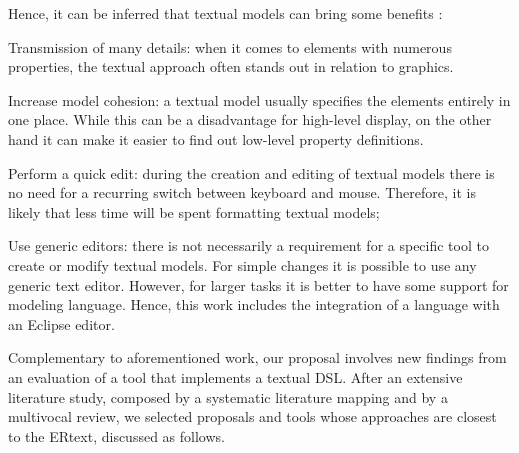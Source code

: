 \documentclass[a4paper,twoside,anonymous]{article}
\begin{document}
Hence, it can be inferred that textual models can bring some benefits \cite{XtextSirius:2020}:
\begin{inparaenum}[(i)]
    \item Transmission of many details: when it comes to elements with numerous properties, the textual approach often stands out in relation to graphics.
    \item Increase model cohesion: a textual model usually specifies the elements entirely in one place.
    While this can be a disadvantage for high-level display, on the other hand it can make it easier to find out low-level property definitions.
    \item Perform a quick edit: during the creation and editing of textual models there is no need for a recurring switch between keyboard and mouse.
    Therefore, it is likely that less time will be spent formatting textual models;
    \item Use generic editors: there is not necessarily a requirement for a specific tool to create or modify textual models.
    For simple changes it is possible to use any generic text editor.
    However, for larger tasks it is better to have some support for modeling language.
    Hence, this work includes the integration of a language with an Eclipse editor.
\end{inparaenum}

Complementary to aforementioned work, our proposal involves new findings from an evaluation of a tool that implements a textual DSL. 
After an extensive literature study, composed by a systematic literature mapping and by a multivocal review, %
we selected proposals and tools whose approaches are closest to the ERtext, discussed as follows.
\end{document}
